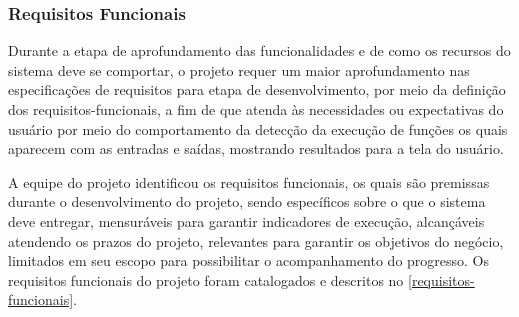 \subsubsection{Requisitos Funcionais}
Durante a etapa de aprofundamento das funcionalidades e de como os recursos do sistema deve se comportar, o projeto requer um maior aprofundamento nas especificações de requisitos para etapa de desenvolvimento, por meio da definição dos \gls{requisitos-funcionais}, a fim de que atenda às necessidades ou expectativas do usuário por meio do comportamento da detecção da execução de funções os quais aparecem com as entradas e saídas, mostrando resultados para a tela do usuário.

A equipe do projeto identificou os requisitos funcionais, os quais são premissas durante o desenvolvimento do projeto, sendo específicos sobre o que o sistema deve entregar, mensuráveis para garantir indicadores de execução, alcançáveis atendendo os prazos do projeto, relevantes para garantir os objetivos do negócio, limitados em seu escopo para possibilitar o acompanhamento do progresso. 
Os requisitos funcionais do projeto foram catalogados e descritos no \autoref{requisitos-funcionais}.



